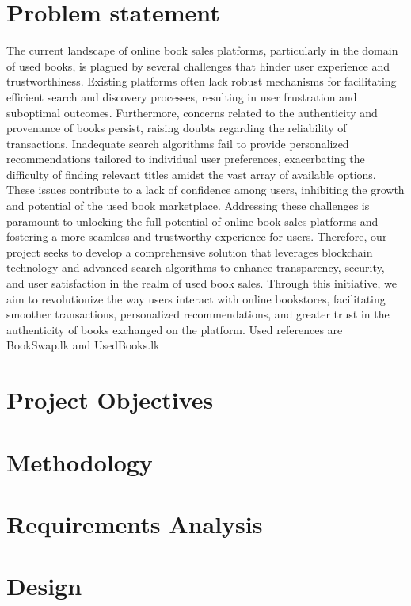 \documentclass{article}
\begin{document}
\section{Problem statement}
The current landscape of online book sales platforms, particularly in the domain of used books, is plagued by several challenges that hinder user experience and trustworthiness. Existing platforms often lack robust mechanisms for facilitating efficient search and discovery processes, resulting in user frustration and suboptimal outcomes. Furthermore, concerns related to the authenticity and provenance of books persist, raising doubts regarding the reliability of transactions. Inadequate search algorithms fail to provide personalized recommendations tailored to individual user preferences, exacerbating the difficulty of finding relevant titles amidst the vast array of available options. These issues contribute to a lack of confidence among users, inhibiting the growth and potential of the used book marketplace. Addressing these challenges is paramount to unlocking the full potential of online book sales platforms and fostering a more seamless and trustworthy experience for users. Therefore, our project seeks to develop a comprehensive solution that leverages blockchain technology and advanced search algorithms to enhance transparency, security, and user satisfaction in the realm of used book sales. Through this initiative, we aim to revolutionize the way users interact with online bookstores, facilitating smoother transactions, personalized recommendations, and greater trust in the authenticity of books exchanged on the platform. Used references are BookSwap.lk and UsedBooks.lk

\section{Project Objectives}

\section{Methodology}

\section{Requirements Analysis}

\section{Design}
\end{document}
